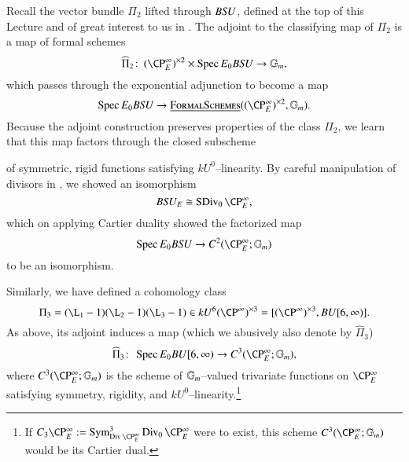 \begin{example}\label{AdjointBSUExample}
Recall the vector bundle $\Pi_2$ lifted through $B\mathit{SU}$, defined at the top of this Lecture and of great interest to us in .  The adjoint to the classifying map of $\Pi_2$ is a map of formal schemes \[\widehat \Pi_2\co (\CP^\infty_E)^{\times 2} \times \Spec E_0 B\SU \to \Gm,\] which passes through the exponential adjunction to become a map \[\Spec E_0 B\SU \to \InternalHom{FormalSchemes}((\CP^\infty_E)^{\times 2}, \Gm).\]  Because the adjoint construction preserves properties of the class $\Pi_2$, we learn that this map factors through the closed subscheme
\begin{center}
\end{center}
of symmetric, rigid functions satisfying $kU^0$--linearity.  By careful manipulation of divisors in , we showed an isomorphism \[B\SU_E \cong \SDiv_0 \CP^\infty_E,\] which on applying Cartier duality showed the factorized map \[\Spec E_0 B\SU \to C^2(\CP^\infty_E; \Gm)\] to be an isomorphism.
\end{example}

\begin{example}
Similarly, we have defined a cohomology class \[\Pi_3 = (\L_1 - 1)(\L_2 - 1)(\L_3 - 1) \in kU^6(\CP^\infty)^{\times 3} = [(\CP^\infty)^{\times 3}, BU[6, \infty)].\]  As above, its adjoint induces a map (which we abusively also denote by $\widehat \Pi_3$) \[\widehat \Pi_3\co \Spec E_0 BU[6, \infty) \to C^3(\CP^\infty_E; \Gm),\] where $C^3(\CP^\infty_E; \Gm)$ is the scheme of $\mathbb G_m$--valued trivariate functions on $\CP^\infty_E$ satisfying symmetry, rigidity, and $kU^0$--linearity.\footnote{If $C_3 \CP^\infty_E := \Sym^3_{\Div \CP^\infty_E} \Div_0 \CP^\infty_E$ were to exist, this scheme $C^3(\CP^\infty_E; \Gm)$ would be its Cartier dual.}
\end{example}


